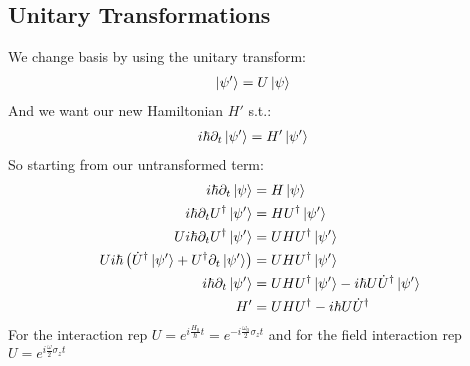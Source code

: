 \subsection{Unitary Transformations}
We change basis by using the unitary transform:
\begin{align*}
	\ket{\psi'} &= U\ket{\psi}
\end{align*}
And we want our new Hamiltonian $H'$ s.t.:
\begin{align*}
	i\hbar \partial_t \ket{\psi'} &= H'\ket{\psi'}
\end{align*}
So starting from our untransformed term:
\begin{align*}
	i\hbar \partial_t \ket{\psi} &= H\ket{\psi} \\
	i\hbar \partial_t U^\dagger\ket{\psi'} &= HU^\dagger\ket{\psi'}\\
	Ui\hbar \partial_t U^\dagger\ket{\psi'} &= UHU^\dagger\ket{\psi'}\\
	Ui\hbar \left( \dot{U}^\dagger\ket{\psi'} + U^\dagger\partial_t \ket{\psi'}\right) &= UHU^\dagger\ket{\psi'}\\
	i\hbar \partial_t \ket{\psi'} &= UHU^\dagger\ket{\psi'} - i\hbar U\dot{U}^\dagger\ket{\psi'} \\
	H' &= UHU^\dagger -i\hbar U\dot{U}^\dagger
\end{align*}
For the interaction rep $U = e^{i\frac{H_0}{\hbar} t} = e^{-i\frac{\omega_0}{2}\sigma_z t}$ and for the field interaction rep $U = e^{i\frac{\omega}{2}\sigma_z t}$
